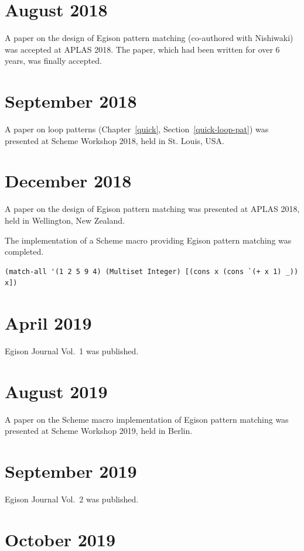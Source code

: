 \section*{August 2018}

A paper on the design of Egison pattern matching (co-authored with Nishiwaki) was accepted at APLAS 2018.
The paper, which had been written for over 6 years, was finally accepted.

\section*{September 2018}

A paper on loop patterns (Chapter~\ref{quick}, Section~\ref{quick-loop-pat}) was presented at Scheme Workshop 2018, held in St. Louis, USA.

\section*{December 2018}

A paper on the design of Egison pattern matching was presented at APLAS 2018, held in Wellington, New Zealand.

The implementation of a Scheme macro providing Egison pattern matching was completed.
\begin{lstlisting}[numbers=none]
(match-all '(1 2 5 9 4) (Multiset Integer) [(cons x (cons `(+ x 1) _)) x])
\end{lstlisting}

\section*{April 2019}

Egison Journal Vol.\ 1 was published.

\section*{August 2019}

A paper on the Scheme macro implementation of Egison pattern matching was presented at Scheme Workshop 2019, held in Berlin.

\section*{September 2019}

Egison Journal Vol.\ 2 was published.

\section*{October 2019}

